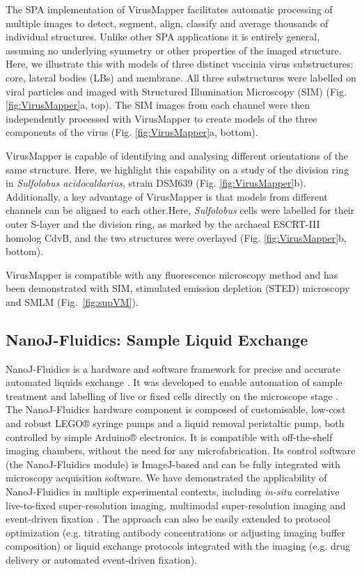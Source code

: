  The SPA implementation of VirusMapper facilitates automatic processing of multiple images to detect, segment, align, classify and average thousands of individual structures. Unlike other SPA applications it is entirely general, assuming no underlying symmetry or other properties of the imaged structure. Here, we illustrate this with models of three distinct vaccinia virus \cite{FieldsVirology2013} substructures: core, lateral bodies (LBs) and membrane. All three substructures were labelled on viral particles and imaged with Structured Illumination Microscopy (SIM) \cite{gustafsson2000surpassing} (Fig. \ref{fig:VirusMapper}a, top). The SIM images from each channel were then independently processed with VirusMapper to create models of the three components of the virus (Fig. \ref{fig:VirusMapper}a, bottom). 

 VirusMapper is capable of identifying and analysing different orientations of the same structure. Here, we highlight this capability on a study of the division ring in \emph{Sulfolobus acidocaldarius}, strain DSM639 (Fig. \ref{fig:VirusMapper}b). Additionally, a key advantage of VirusMapper is that models from different channels can be aligned to each other.Here, \emph{Sulfolobus} cells were labelled for their outer S-layer and the division ring, as marked by the archaeal ESCRT-III homolog CdvB, and the two structures were overlayed (Fig. \ref{fig:VirusMapper}b, bottom).
 
 VirusMapper is compatible with any fluorescence microscopy method and has been demonstrated with SIM, stimulated emission depletion (STED) microscopy \cite{gray2016virusmapper} and SMLM (Fig.~\ref{fig:supVM}).

\subsection*{NanoJ-Fluidics: Sample Liquid Exchange}

 NanoJ-Fluidics is a hardware and software framework for precise and accurate automated liquids exchange \cite{almada2018automating}. It was developed to enable automation of sample treatment and labelling of live or fixed cells directly on the microscope stage \cite{almada2018automating, dix2018role}. The NanoJ-Fluidics hardware component is composed of customisable, low-cost and robust LEGO® syringe pumps and a liquid removal peristaltic pump, both controlled by simple Arduino® electronics. It is compatible with off-the-shelf imaging chambers, without the need for any microfabrication. Its control software (the NanoJ-Fluidics module) is ImageJ-based and can be fully integrated with microscopy acquisition software. We have demonstrated the applicability of NanoJ-Fluidics in multiple experimental contexts, including \textit{in-situ} correlative live-to-fixed super-resolution imaging, multimodal super-resolution imaging and event-driven fixation \cite{almada2018automating}. The approach can also be easily extended to protocol optimization (e.g. titrating antibody concentrations or adjusting imaging buffer composition) or liquid exchange protocols integrated with the imaging (e.g. drug delivery or automated event-driven fixation).

